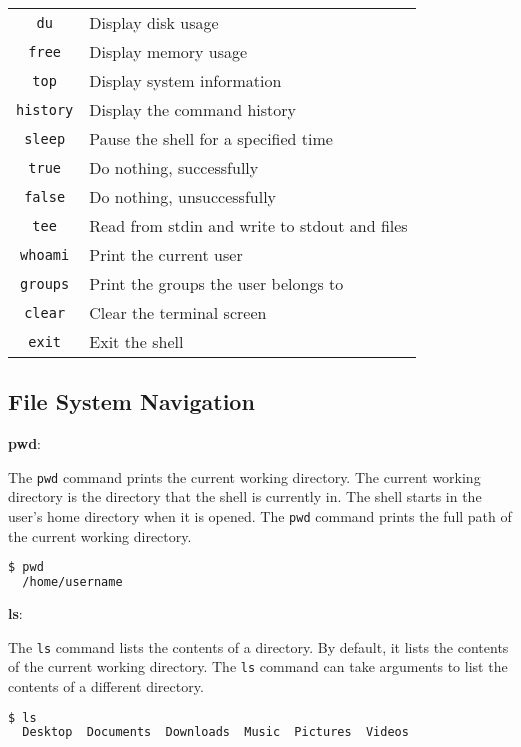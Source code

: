 \begin{table*}[h!]
\begin{tabular}{ c l }
  \lstinline|du| & Display disk usage \\
  \lstinline|free| & Display memory usage \\
  \lstinline|top| & Display system information \\
  \lstinline|history| & Display the command history \\
  \lstinline|sleep| & Pause the shell for a specified time \\
  \lstinline|true| & Do nothing, successfully \\
  \lstinline|false| & Do nothing, unsuccessfully \\
  \lstinline|tee| & Read from stdin and write to stdout and files \\
  \lstinline|whoami| & Print the current user \\
  \lstinline|groups| & Print the groups the user belongs to \\
  \lstinline|clear| & Clear the terminal screen \\
  \lstinline|exit| & Exit the shell \\
  \bottomrule
\end{tabular}
\end{table*}

\subsection{File System Navigation}

\textbf{pwd}:

The \lstinline|pwd| command prints the current working directory. The current working directory is the directory that the shell is currently in. The shell starts in the user's home directory when it is opened. The \lstinline|pwd| command prints the full path of the current working directory.

\begin{lstlisting}[language=bash]
  $ pwd
  /home/username
\end{lstlisting}

\textbf{ls}:

The \lstinline|ls| command lists the contents of a directory. By default, it lists the contents of the current working directory. The \lstinline|ls| command can take arguments to list the contents of a different directory.

\begin{lstlisting}[language=bash]
  $ ls
  Desktop  Documents  Downloads  Music  Pictures  Videos
\end{lstlisting}

